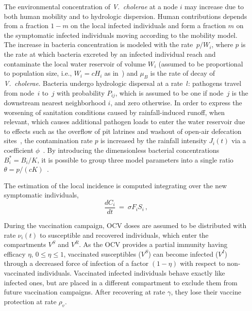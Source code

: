 The environmental concentration of \textit{V.~cholerae} at a node $i$ may increase due to both human mobility and to hydrologic dispersion. Human contributions depends from a fraction $1-m$ on the local infected individuals and form a fraction $m$ on the symptomatic infected individuals moving according to the mobility model. The increase in bacteria concentration is modeled with the rate~$p/W_i$, where $p$ is the rate at which bacteria excreted by an infected individual reach and contaminate the local water reservoir of volume $W_i$ (assumed to be proportional to population size, i.e., $W_i=c H_i$ as in~\cite{rinaldo_reassessment_2012}) and $\mu_B$ is the rate of decay of \textit{V.~cholerae}. Bacteria undergo hydrologic dispersal at a rate~$l$: pathogens travel from node~$i$ to~$j$ with probability $P_{ij}$, which is assumed to be one if node~$j$ is the downstream nearest neighborhood $i$, and zero otherwise. In order to express the worsening of sanitation conditions caused by rainfall-induced runoff, when relevant, which causes additional pathogen loads to enter the water reservoir due to effects such as the overflow of pit latrines and washout of open-air defecation sites~\cite{gaudart_spatio-temporal_2013}, the contamination rate $p$ is increased by the rainfall intensity $J_i(t)$ via a coefficient $\phi$~\cite{rinaldo_reassessment_2012,righetto_rainfall_2013}. By introducing the dimensionless bacterial concentrations $B_i^*=B_i/K$,  it is possible to group three model parameters into a single ratio $\theta=p/(cK)$~\cite{bertuzzo_space-time_2008}.



The estimation of the local incidence is computed integrating over the new symptomatic individuals,
%
\begin{equation}
\frac{d C_i}{dt} \ = \ \sigma F_i S_i  \, , \label{eq:C}
\end{equation}

During the vaccination campaign, OCV doses are assumed to be distributed with rate $\nu_i(t)$ to susceptible and recovered individuals, which enter the compartments $V^S$ and $V^R$. As the OCV provides a partial immunity having efficacy $\eta$, $0\leq \eta \leq 1$, vaccinated susceptibles ($V^S$) can become infected ($V^I$) through a decreased force of infection of a factor $(1-\eta)$ with respect to non-vaccinated individuals. Vaccinated infected individuals behave exactly like infected ones, but are placed in a different compartment to exclude them from future vaccination campaigns. After recovering at  rate $\gamma$, they lose their vaccine protection at rate $\rho_{v}$.


